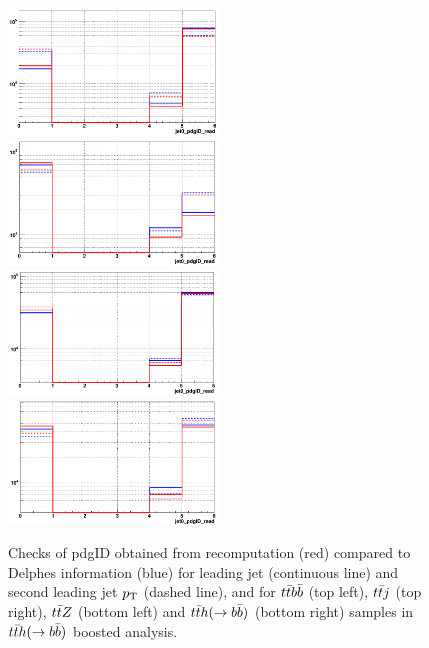 \documentclass{cernrep}
\begin{document}
\begin{figure}[!htb]\centering
\includegraphics[width=0.495\textwidth]{Fig/check_TRF/tth_boosted/jet12pdgID_ttbb_redModule_blueDELPHES.png}
\includegraphics[width=0.495\textwidth]{Fig/check_TRF/tth_boosted/jet12pdgID_ttj_redModule_blueDELPHES.png}
\includegraphics[width=0.495\textwidth]{Fig/check_TRF/tth_boosted/jet12pdgID_ttz_redModule_blueDELPHES.png}
\includegraphics[width=0.495\textwidth]{Fig/check_TRF/tth_boosted/jet12pdgID_tth_redModule_blueDELPHES.png}
\caption{Checks of pdgID obtained from recomputation (red) compared to Delphes information (blue) for leading jet (continuous line) and second leading jet $p\sb{\scriptstyle\mathrm{T}}$ (dashed line), and for $t\bar{t}b\bar{b}$ (top left), $t\bar{t}j$ (top right), $t\bar{t}Z$ (bottom left) and $t\bar{t}h(\rightarrow b\bar{b})$ (bottom right) samples in $t\bar{t}h(\rightarrow b\bar{b})$ boosted analysis.}
\label{fig:tthboosted_TRFchecks1}
\end{figure}
\end{document}
